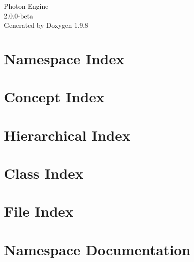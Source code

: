 \documentclass[twoside]{book}
\newcommand{\+}{\discretionary{\mbox{\scriptsize$\hookleftarrow$}}{}{}}
\newcommand{\clearemptydoublepage}{%
    \newpage{\pagestyle{empty}\cleardoublepage}%
  }
\begin{document}
  \raggedbottom
    \hypersetup{pageanchor=false,
                bookmarksnumbered=true,
                pdfencoding=unicode
               }
  \begin{titlepage}
  \vspace*{7cm}
  \begin{center}%
  {\Large Photon Engine}\\
  [1ex]\large 2.\+0.\+0-\/beta \\
  \vspace*{1cm}
  {\large Generated by Doxygen 1.9.8}\\
  \end{center}
  \end{titlepage}
  \clearemptydoublepage
  \tableofcontents
  \clearemptydoublepage
  \hypersetup{pageanchor=true}


\chapter{Namespace Index}

\chapter{Concept Index}

\chapter{Hierarchical Index}

\chapter{Class Index}

\chapter{File Index}

\chapter{Namespace Documentation}



\end{document}
